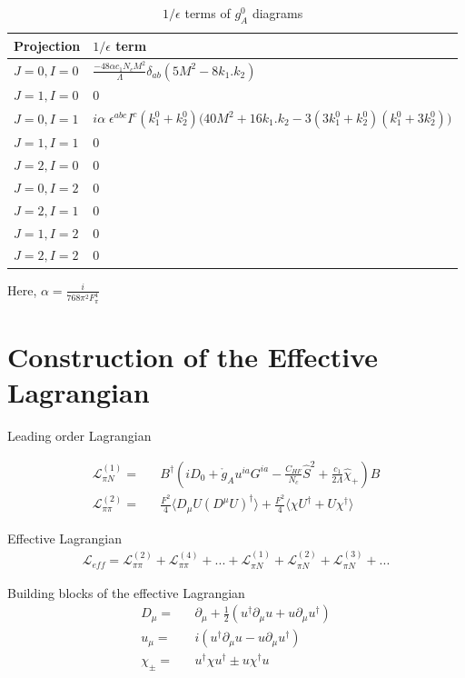 \documentclass{article}
\newcommand{\bea}{\begin{eqnarray}}
\newcommand{\eea}{\end{eqnarray}}
\begin{document}
\bgroup
\def\arraystretch{2.5}%
\begin{table}
	[ht]
	\caption{$1/ \epsilon$ terms of $g_A^0$ diagrams}\label{table:gA4} 
	\begin{tabular}{ M{2.0cm} M{9.5cm}}
		\hline 
		Projection  & $1/ \epsilon$ term \\
		\hline 
		$J=0,I=0$ &  $ \frac{-48 \alpha c_1 N_c M^2}{\Lambda} \delta_{ab} (5M^2-8k_1.k_2)$  \\ 
		$J=1,I=0$ &  $ 0$  \\ 
		$J=0,I=1$ &  $ i\alpha\; \epsilon^{abc} I^c \left( k_1^0+k_2^0\right) \bigg( 40 M^2 +16 k_1.k_2 -3 (3k_1^0+k_2^0)(k_1^0+3k_2^0) \bigg) $  \\ 
		$J=1,I=1$ &  $  0 $\\
		$J=2,I=0$ &  $  0 $  \\ 
		$J=0,I=2$ &  $ 0 $  \\ 
		$J=2,I=1$ &  $  0 $  \\ 
		$J=1,I=2$ &  $  0 $  \\ 
		$J=2,I=2$ &  $  0 $  \\ 
		\hline
	\end{tabular}
\end{table}
\egroup

Here, $\alpha= \frac{ i}{768 \pi^2 F_\pi^4} $



\newpage
\section{Construction of the Effective Lagrangian}

Leading order Lagrangian

\bea
\mathcal{L}_{\pi N}^{(1)} = && B^{\dag} \left( iD_0 + \mathring{g}_A u^{ia} G^{ia} -\frac{C_{HF}}{N_c} \hat{S}^2 +\frac{c_1}{2 \Lambda } \hat{\chi}_+ \right) B \nonumber \\
\mathcal{L}_{\pi \pi}^{(2)} = && \frac{F^{2}}{4} \Big \langle D_{\mu} U (D^{\mu} U)^{\dag} \Big \rangle +\frac{F^{2}}{4} \Big \langle   \chi U^{\dag}  +U \chi ^{\dag} \Big \rangle \nonumber
\eea

Effective Lagrangian
\bea
\mathcal{L}_{eff} = \mathcal{L}_{\pi \pi}^{(2)} +\mathcal{L}_{\pi \pi}^{(4)}+...+\mathcal{L}_{\pi N}^{(1)}+\mathcal{L}_{\pi N}^{(2)}+\mathcal{L}_{\pi N}^{(3)}+...\nonumber
\eea


Building blocks of the effective Lagrangian
\bea
D_{\mu} = && \partial_{\mu}+ \frac{1}{2} \left(  u^{\dag} \partial_{\mu} u + u \partial_{\mu} u^{\dag} \right)  \nonumber\\
u_{\mu} = && i \left(  u^{\dag} \partial_{\mu} u - u \partial_{\mu} u^{\dag} \right) \nonumber\\
\chi_{\pm}  = && u^{\dagger} \chi u^{\dagger} \pm u \chi^{\dagger} u \nonumber
\eea
\end{document}
